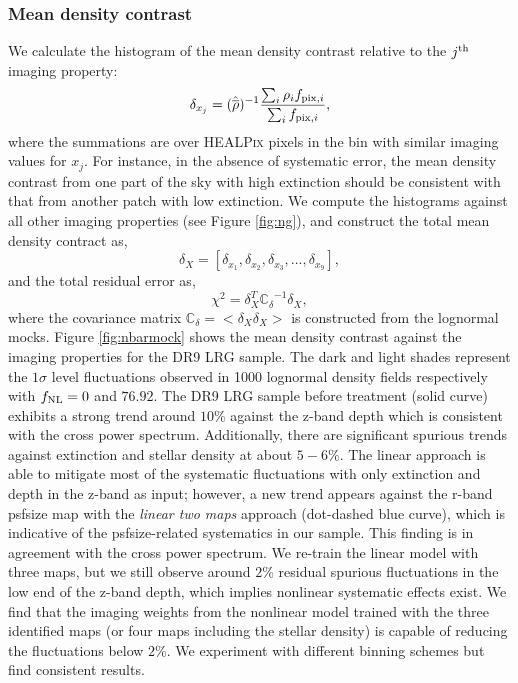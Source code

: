 \subsubsection{Mean density contrast}
We calculate the histogram of the mean density contrast relative to the $j^{\rm th}$ imaging property:
\begin{equation}
\delta_{x_{j}} = ({\hat{\overline{\rho}}})^{-1} \frac{\sum_{i} \rho_{i} f_{{\rm pix}, i}}{\sum_{i} f_{{\rm pix}, i}},
\end{equation}
where the summations are over \textsc{HEALPix} pixels in the bin with similar imaging values for $x_{j}$. For instance, in the absence of systematic error, the mean density contrast from one part of the sky with high extinction should be consistent with that from another patch with low extinction. We compute the histograms against all other imaging properties (see Figure \ref{fig:ng}), and construct the total mean density contract as,
\begin{equation}
\delta_{X} = [\delta_{x_{1}}, \delta_{x_{2}}, \delta_{x_{3}}, ..., \delta_{x_{9}}],
\end{equation}
and the total residual error as,
\begin{equation}
\chi^{2} = \delta_{X}^{T} \mathbb{C_{\delta}}^{-1} \delta_{X},
\end{equation}
where the covariance matrix $\mathbb{C}_{\delta} = < \delta_{X} \delta_{X}>$ is constructed from the lognormal mocks. Figure \ref{fig:nbarmock} shows the mean density contrast against the imaging properties for the DR9 LRG sample. The dark and light shades represent the $1\sigma$ level fluctuations observed in 1000 lognormal density fields respectively with $f_{\rm NL}=0$ and $76.92$. The DR9 LRG sample before treatment (solid curve) exhibits a strong trend around $10\%$ against the z-band depth which is consistent with the cross power spectrum. Additionally, there are significant spurious trends against extinction and stellar density at about $5-6\%$. The linear approach is able to mitigate most of the systematic fluctuations with only extinction and depth in the z-band as input; however,  a new trend appears against the r-band psfsize map with the \textit{linear two maps} approach (dot-dashed blue curve), which is indicative of the psfsize-related systematics in our sample. This finding is in agreement with the cross power spectrum. We re-train the linear model with three maps, but we still observe around $2\%$ residual spurious fluctuations in the low end of the z-band depth, which implies nonlinear systematic effects exist. We find that the imaging weights from the nonlinear model trained with the three identified maps (or four maps including the stellar density) is capable of reducing the fluctuations below $2\%$. We experiment with different binning schemes but find consistent results.

